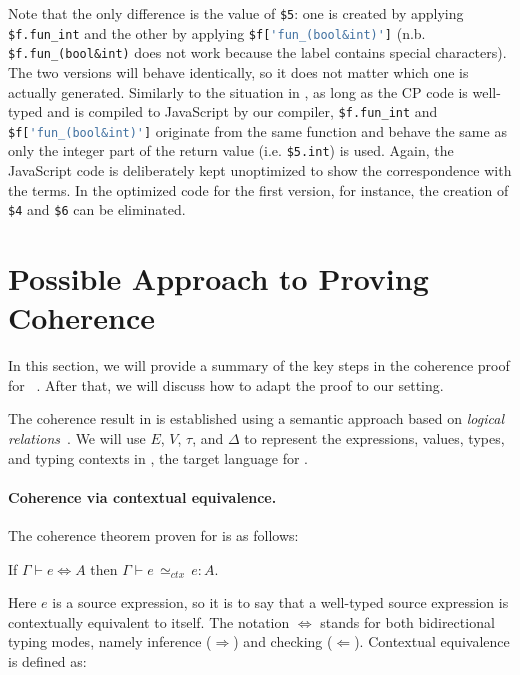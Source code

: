 \noindent
Note that the only difference is the value of \lstinline{$5}: one is created by
applying \lstinline{$f.fun_int} and the other by applying
\lstinline[language=TypeScript]{$f['fun_(bool&int)']}
(n.b. \lstinline{$f.fun_(bool&int)} does not work because the label contains
special characters). The two versions will behave identically, so it does not
matter which one is actually generated. Similarly to the situation in \lambdar,
as long as the CP code is well-typed and is compiled to JavaScript by our
compiler, \lstinline{$f.fun_int} and
\lstinline[language=TypeScript]{$f['fun_(bool&int)']} originate from the same
function and behave the same as only the integer part of the return value  (i.e.
\lstinline{$5.int}) is used. Again, the JavaScript code is deliberately kept
unoptimized to show the correspondence with the \lambdar terms. In the optimized
code for the first version, for instance, the creation of \lstinline{$4} and
\lstinline{$6} can be eliminated.

\section{Possible Approach to Proving Coherence} \label{sec:coherence}

In this section, we will provide a summary of the key steps in the coherence
proof for \necolus~\citep{bi2018essence}. After that, we will discuss how to
adapt the proof to our setting.

The coherence result in \necolus is established using a semantic approach based
on \emph{logical relations}~\citep{tait1967intensional,biernacki2015logical}.
We will use $E$, $V$, $\tau$, and $\Delta$ to represent the expressions, values, types, and
typing contexts in \lambdac, the target language for \necolus.

\paragraph{Coherence via contextual equivalence.}
The coherence theorem proven for \necolus is as follows:

\begin{theorem}\label{thm:coherence}
If $\Gamma \vdash e \Leftrightarrow A$
then $\Gamma \vdash e \, {\simeq}_\mathit{ctx} \, e : A$.
\end{theorem}

\noindent
Here $e$ is a source expression, so it is to say that a well-typed source
expression is contextually equivalent to itself. The notation $\Leftrightarrow$
stands for both bidirectional typing modes, namely inference ($\Rightarrow$) and
checking ($\Leftarrow$). Contextual equivalence is defined as:


